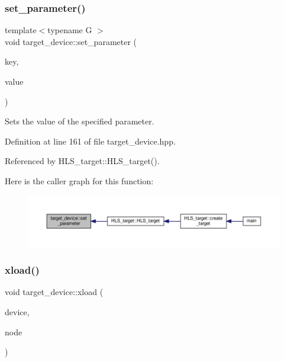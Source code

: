 \subsubsection{\texorpdfstring{set\+\_\+parameter()}{set\_parameter()}}
{\footnotesize\ttfamily template$<$typename G $>$ \\
void target\+\_\+device\+::set\+\_\+parameter (\begin{DoxyParamCaption}\item[{const std\+::string \&}]{key,  }\item[{G}]{value }\end{DoxyParamCaption})\hspace{0.3cm}{\ttfamily [inline]}}



Sets the value of the specified parameter. 



Definition at line 161 of file target\+\_\+device.\+hpp.



Referenced by H\+L\+S\+\_\+target\+::\+H\+L\+S\+\_\+target().

Here is the caller graph for this function\+:
\nopagebreak
\begin{figure}[H]
\begin{center}
\leavevmode
\includegraphics[width=350pt]{d9/dd8/classtarget__device_a4112dad098867bd963a236a7374d4ba8_icgraph}
\end{center}
\end{figure}
\mbox{\label{classtarget__device_a1a2a15130520d7298b0633cbd81757ac}} 
\subsubsection{\texorpdfstring{xload()}{xload()}}
{\footnotesize\ttfamily void target\+\_\+device\+::xload (\begin{DoxyParamCaption}\item[{const \hyperlink{target__device_8hpp_acedb2b7a617e27e6354a8049fee44eda}{target\+\_\+device\+Ref} \&}]{device,  }\item[{const \hyperlink{classxml__element}{xml\+\_\+element} $\ast$}]{node }\end{DoxyParamCaption})}



